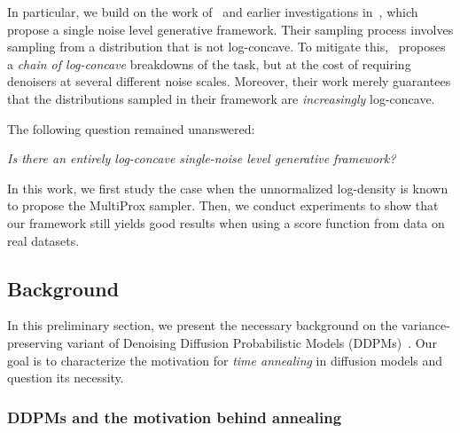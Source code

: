 In particular, we build on the work of~\cite{saremi_multimeasurement_2022} and earlier investigations in~\cite{jain_journey_2022}, which propose a single noise level generative framework. Their sampling process involves sampling from a distribution that is not log-concave. To mitigate this,~\cite{saremi_chain_2024} proposes a \emph{chain of log-concave} breakdowns of the task, but at the cost of requiring denoisers at several different noise scales. Moreover, their work merely guarantees that the distributions sampled in their framework are \emph{increasingly} log-concave. 

The following question remained unanswered:
\begin{center}
    \emph{Is there an entirely log-concave single-noise level generative framework?}
\end{center}

In this work, we first study the case when the unnormalized log-density is known to propose the MultiProx sampler. Then, we conduct experiments to show that our framework still yields good results when using a score function from data on real datasets. 

\subsection{Background}
\label{sec:background_multiprox}

In this preliminary section, we present the necessary background on the variance-preserving variant of Denoising Diffusion Probabilistic Models (DDPMs)~\cite{ho_denoising_2020}. Our goal is to characterize the motivation for \emph{time annealing} in diffusion models and question its necessity. 

\subsubsection{DDPMs and the motivation behind annealing}

